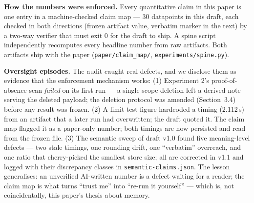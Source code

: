 \documentclass[11pt]{article}
\begin{document}
\textbf{How the numbers were enforced.} Every quantitative claim in this paper is one entry in a machine-checked claim map --- 30 datapoints in this draft, each checked in both directions (frozen artifact value, verbatim marker in the text) by a two-way verifier that must exit 0 for the draft to ship. A spine script independently recomputes every headline number from raw artifacts. Both artifacts ship with the paper (\texttt{paper/claim\_map/}, \texttt{experiments/spine.py}).

\textbf{Oversight episodes.} The audit caught real defects, and we disclose them as evidence that the enforcement mechanism works: (1) Experiment 2's proof-of-absence scan \emph{failed} on its first run --- a single-scope deletion left a derived note serving the deleted payload; the deletion protocol was amended (Section~3.4) before any result was frozen. (2) A limit-test figure hardcoded a timing (2.112\,s) from an artifact that a later run had overwritten; the draft quoted it. The claim map flagged it as a paper-only number; both timings are now persisted and read from the frozen file. (3) The semantic sweep of draft v1.0 found five meaning-level defects --- two stale timings, one rounding drift, one ``verbatim'' overreach, and one ratio that cherry-picked the smallest store size; all are corrected in v1.1 and logged with their discrepancy classes in \texttt{semantic-claims.json}. The lesson generalises: an unverified AI-written number is a defect waiting for a reader; the claim map is what turns ``trust me'' into ``re-run it yourself'' --- which is, not coincidentally, this paper's thesis about memory.
\end{document}
